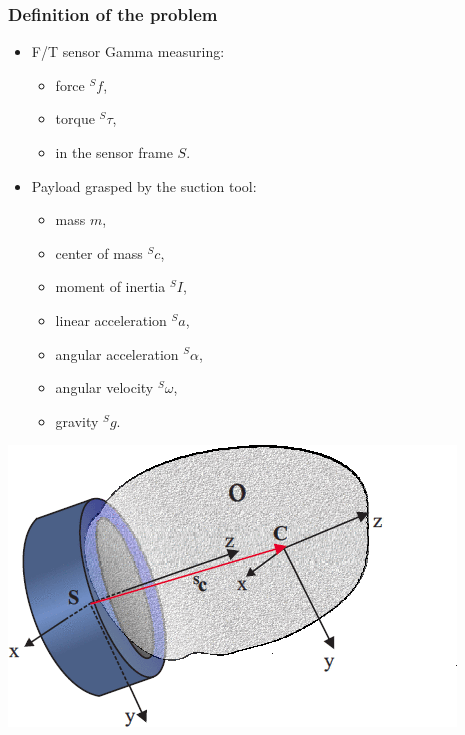 \documentclass[usenames,dvipsnames]{beamer}
\begin{document}
\begin{frame}
 \frametitle{Definition of the problem}



 \begin{minipage}{.5\textwidth}
  \begin{itemize}
   \item F/T sensor Gamma measuring:
         \begin{itemize}
          \item force ${}^S f$,
          \item torque ${}^S \tau$,
          \item in the sensor frame $S$.
         \end{itemize}
   \item Payload grasped by the suction tool:
         \begin{itemize}
          \item mass $m$,
          \item center of mass ${}^S c$,
          \item moment of inertia ${}^S I$,
          \item linear acceleration ${}^S a$,
          \item angular acceleration ${}^S \alpha$,
          \item angular velocity ${}^S \omega$,
          \item gravity ${}^S g$.
         \end{itemize}
  \end{itemize}
 \end{minipage}%
 \begin{minipage}{0.5\textwidth}
  \centering
  \includegraphics[scale=0.4]{images/scheme.png}
 \end{minipage}

\end{frame}
\end{document}

